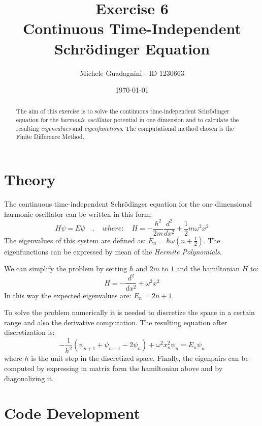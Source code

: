 \documentclass[11pt,a4paper]{article}
\author{Michele Guadagnini - ID 1230663}
\title{\textbf{Exercise 6 \\ Continuous Time-Independent Schr\"odinger Equation}}
\date{\today}
\begin{document}
\maketitle

\vspace{20pt}
\begin{abstract}
	The aim of this exercise is to solve the continuous time-independent Schr\"odinger equation for the \textit{harmonic oscillator} potential in one dimension and to calculate the resulting \textit{eigenvalues} and \textit{eigenfunctions}. The computational method chosen is the Finite Difference Method.
\end{abstract}

\section{Theory} %

The continuous time-independent Schr\"odinger equation for the one dimensional harmonic oscillator can be written in this form:
\begin{equation}
H \psi = E \psi \quad , \quad where: \quad H = -\frac{\hbar^2}{2m}\frac{d^2}{dx^2} + \frac{1}{2}m\omega^2 x^2
\label{eq:SE}
\end{equation}
The eigenvalues of this system are defined as: $E_n = \hbar\omega(n+\frac{1}{2})$.
The eigenfunctions can be expressed by mean of the \textit{Hermite Polynomials}.

We can simplify the problem by setting $\hbar$ and $2m$ to $1$ and the hamiltonian $H$ to:
\begin{equation}
H = -\frac{d^2}{dx^2} + \omega^2 x^2
\label{eq:hamiltonian}
\end{equation}
In this way the expected eigenvalues are: $E_n = 2n+1$.

To solve the problem numerically it is needed to discretize the space in a certain range and also the derivative computation. 
The resulting equation after discretization is:
\begin{equation}
-\frac{1}{h^2}(\psi_{n+1} + \psi_{n-1} - 2\psi_n) + \omega^2 x_{n}^2\psi_n = E_n\psi_n
\label{eq:discreteSE}
\end{equation}
where $h$ is the unit step in the discretized space.
Finally, the eigenpairs can be computed by expressing in matrix form the hamiltonian above and by diagonalizing it. 

\section{Code Development} %
\end{document}
